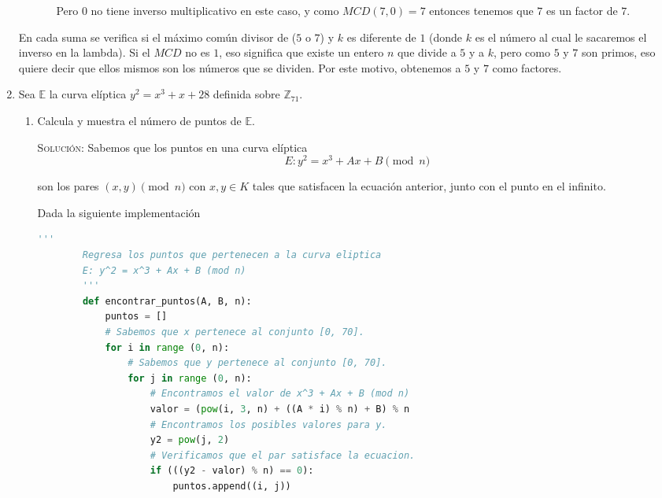 \documentclass[letterpaper,11pt]{article}
\begin{document}
\begin{enumerate}
\begin{enumerate}
\begin{itemize}
            Pero $0$ no tiene inverso multiplicativo en este caso, y como 
            $MCD(7, 0) = 7$ entonces tenemos que $7$ es un factor de $7$.
        \end{itemize}
    \end{enumerate}

    En cada suma se verifica si el máximo común divisor de ($5$ o $7$) y $k$ es 
    diferente de $1$ (donde $k$ es el número al cual le sacaremos el inverso en 
    la lambda). Si el $MCD$ no es $1$, eso significa que existe un entero $n$ 
    que divide a $5$ y a $k$, pero como $5$ y $7$ son primos, eso quiere decir 
    que ellos mismos son los números que se dividen. Por este motivo, obtenemos 
    a $5$ y $7$ como factores.

    \item Sea $\mathbb{E}$ la curva elíptica $y^2 = x^3 + x + 28$ definida sobre 
    $\mathbb{Z}_{71}$. 
    \begin{enumerate}
        \item Calcula y muestra el número de puntos de $\mathbb{E}$.
        
        \textsc{Solución:} Sabemos que los puntos en una curva elíptica 
        \begin{equation*}
            E : y^2 = x^3 + Ax + B \pmod{n}
        \end{equation*}
        
        son los pares $(x, y) \pmod{n}$ con $x, y \in K$ tales que satisfacen
        la ecuación anterior, junto con el punto en el infinito. 
        
        \newpage
        Dada la siguiente implementación
        \begin{lstlisting}[language = Python]
        '''
        Regresa los puntos que pertenecen a la curva eliptica 
        E: y^2 = x^3 + Ax + B (mod n)
        '''
        def encontrar_puntos(A, B, n):
            puntos = []
            # Sabemos que x pertenece al conjunto [0, 70].
            for i in range (0, n):
                # Sabemos que y pertenece al conjunto [0, 70]. 
                for j in range (0, n):
                    # Encontramos el valor de x^3 + Ax + B (mod n)
                    valor = (pow(i, 3, n) + ((A * i) % n) + B) % n
                    # Encontramos los posibles valores para y.
                    y2 = pow(j, 2)
                    # Verificamos que el par satisface la ecuacion.
                    if (((y2 - valor) % n) == 0):
                        puntos.append((i, j))
            

\end{lstlisting}
\end{enumerate}
\end{enumerate}
\end{document}
